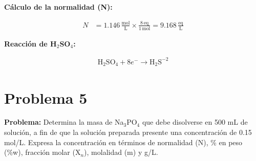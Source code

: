 \documentclass{article}
\begin{document}
\begin{multicols}{2}
\textbf{Cálculo de la normalidad (N):}

\begin{align*}
    N &= 1.146 \, \frac{\text{mol}}{\text{L}} \times \frac{8 \, \text{eq}}{1 \, \text{mol}} = 9.168 \, \frac{\text{eq}}{\text{L}}
\end{align*}

\textbf{Reacción de H$_2$SO$_4$:}

\begin{align*}
    \text{H}_2\text{SO}_4 + 8e^- \rightarrow \text{H}_2\text{S}^{-2} %
\end{align*}

\end{multicols} %









\newpage
\section*{Problema 5}
\textbf{Problema:} Determina la masa de Na$_3$PO$_4$ que debe disolverse en 500 mL de solución, a fin de que la solución preparada presente una concentración de 0.15 mol/L. Expresa la concentración en términos de normalidad (N), \% en peso (\%w), fracción molar (X$_n$), molalidad (m) y g/L.
\end{document}
